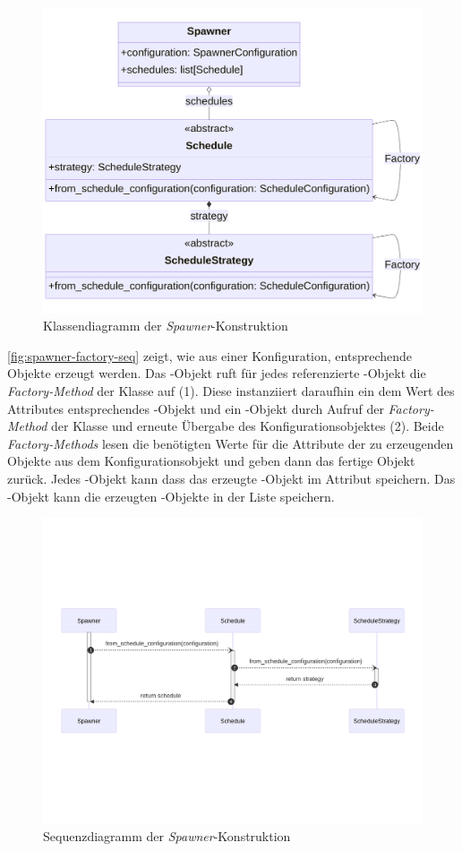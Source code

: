 \begin{figure}[!ht]
	\centering
	\includegraphics[width=1.0\linewidth]{images/diagrams/spawner-factory-class.png}
	\caption{Klassendiagramm der \emph{Spawner}-Konstruktion}
	\label{fig:spawner-factory-class}
\end{figure}

\autoref{fig:spawner-factory-seq} zeigt, wie aus einer Konfiguration, entsprechende Objekte erzeugt werden. Das -Objekt ruft für jedes referenzierte -Objekt die \emph{Factory-Method} der Klasse  auf (1). Diese instanziiert daraufhin ein dem Wert des Attributes  entsprechendes -Objekt und ein -Objekt durch Aufruf der \emph{Factory-Method} der Klasse  und erneute Übergabe des Konfigurationsobjektes (2). Beide \emph{Factory-Methods} lesen die benötigten Werte für die Attribute der zu erzeugenden Objekte aus dem Konfigurationsobjekt und geben dann das fertige Objekt zurück. Jedes -Objekt kann dass das erzeugte -Objekt im Attribut  speichern. Das -Objekt kann die erzeugten -Objekte in der Liste  speichern.

\begin{figure}[!ht]
	\centering
	\includegraphics[width=1.0\linewidth]{images/diagrams/spawner-factory-seq.png}
	\caption{Sequenzdiagramm der \emph{Spawner}-Konstruktion}
	\label{fig:spawner-factory-seq}
\end{figure}
